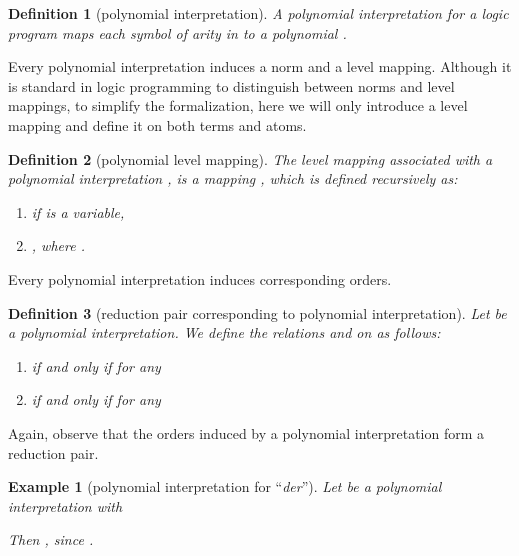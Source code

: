 \documentclass[envcountsame]{tlp}
\newcounter{ex:der-lastsymconsctr}
\newtheorem{definition}{Definition}
\newtheorem{example}{Example}
\begin{document}
\begin{definition}[polynomial interpretation]
\label{def:interpretation}
A \emph{polynomial interpretation}  for a logic program 
maps each 
symbol  of arity  in  to a
polynomial .
\end{definition}

Every polynomial interpretation induces a norm and a level mapping.
Although it is standard in logic programming to distinguish between norms and level
mappings, to simplify the formalization, here
we will only introduce a level mapping and define it
on both terms and atoms.


\begin{definition}[polynomial level mapping]
\label{def:polynomiallevelmapping}
The \emph{level mapping} associated with a polynomial interpretation , 
is a mapping ,
which is defined recursively as: 
\begin{enumerate}
    \item[-]  if  is a variable,
    \item[-] ,
where . 
\end{enumerate}
\end{definition}













\noindent
Every polynomial interpretation induces corresponding orders.


\begin{definition}[reduction pair corresponding to polynomial interpretation]\label{def:order-on-atom}
Let  be a polynomial
interpretation. We define the relations  and  on
 as follows:
\begin{enumerate}
\item[-]  if and only if
 for any

\item[-]  if and only if
 for any

\end{enumerate}
\end{definition}

Again, observe that the orders induced by a polynomial interpretation form a reduction pair.






\begin{example}[polynomial interpretation for ``\textit{der}'']\label{exam:dist}
Let  be a polynomial interpretation with 

Then , since
.
\end{example}
\end{document}

